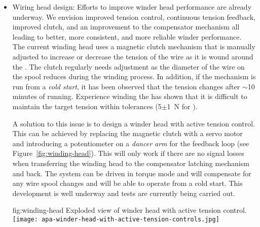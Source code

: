 \begin{itemize}

\item Wiring head design: Efforts to improve winder head performance are already underway. We envision improved tension control, continuous tension feedback, improved clutch, and an improvement to the compensator mechanism all leading to better, more consistent, and more reliable winder performance.  The current winding head uses a magnetic clutch mechanism that is manually adjusted to increase or decrease the tension of the wire as it is wound around the . The clutch regularly needs adjustment as the diameter of the wire on the spool reduces during the winding process. In addition, if the mechanism is run from a \textit{cold start}, it has been observed that the tension changes after $\sim$10 minutes of running. Experience winding the   has shown that it is difficult to maintain the target tension within tolerances (5$\pm$\SI{1}{N} for ).

A solution to this issue is to design a winder head with active tension control. This can be achieved by replacing the magnetic clutch with a servo motor and introducing a potentiometer on a \textit{dancer arm} for the feedback loop (see Figure~\ref{fig:winding-head}). This will only work if there are no signal losses when transferring the winding head to the compensator latching mechanism and back. The system can be driven in torque mode and will compensate for any wire spool changes and will be able to operate from a cold start. This development is well underway and tests are currently being carried out.

\begin{dunefigure}{fig:winding-head}
{Exploded view of winder head with active tension control.}
\texttt{[image: apa-winder-head-with-active-tension-controls.jpg]}
\end{dunefigure}


\end{itemize}
